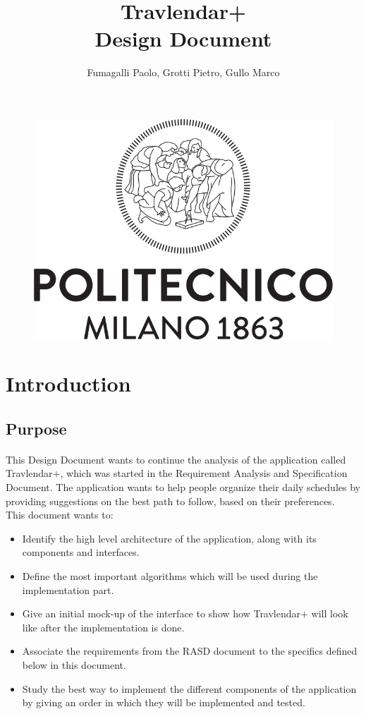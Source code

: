 \documentclass{article}
\title{Travlendar+ \\Design Document}
\author{Fumagalli Paolo, Grotti Pietro, Gullo Marco}
\begin{document}
\begin{figure}[t]
\includegraphics[width=\linewidth]{Images/Logo_Politecnico_Milano.png}
\label{fig:Logo}
\end{figure}
\maketitle
\newpage
{}
\tableofcontents
\newpage
{}
	\section{Introduction}
		\subsection{Purpose}
			\paragraph{}
This Design Document wants to continue the analysis of the application called Travlendar+, which was started in the Requirement Analysis and Specification Document. The application wants to help people organize their daily schedules by providing suggestions on the best path to follow, based on their preferences.\\ This document wants to:
			\begin{itemize}
			\item{}Identify the high level architecture of the application, along with its components and interfaces.
			\item{}Define the most important algorithms which will be used during the implementation part.
			\item{}Give an initial mock-up of the interface to show how Travlendar+ will look like after the implementation is done.
			\item{}Associate the requirements from the RASD document to the specifics defined below in this document.
			\item{}Study the best way to implement the different components of the application by giving an order in which they will be implemented and tested.
			\end{itemize}
\end{document}
